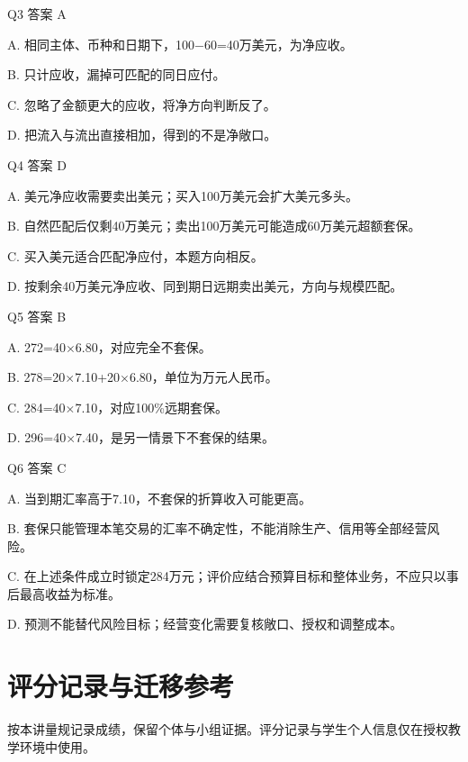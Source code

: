 \documentclass[lang=cn,11pt,oneside,openany,chinesefont=nofont,color=blue,titlestyle=hang]{elegantbook}
\begin{document}
Q3  答案 A

A. 相同主体、币种和日期下，100\ensuremath{-}60=40万美元，为净应收。

B. 只计应收，漏掉可匹配的同日应付。

C. 忽略了金额更大的应收，将净方向判断反了。

D. 把流入与流出直接相加，得到的不是净敞口。

Q4  答案 D

A. 美元净应收需要卖出美元；买入100万美元会扩大美元多头。

B. 自然匹配后仅剩40万美元；卖出100万美元可能造成60万美元超额套保。

C. 买入美元适合匹配净应付，本题方向相反。

D. 按剩余40万美元净应收、同到期日远期卖出美元，方向与规模匹配。

Q5  答案 B

A. 272=40\ensuremath{\times}6.80，对应完全不套保。

B. 278=20\ensuremath{\times}7.10+20\ensuremath{\times}6.80，单位为万元人民币。

C. 284=40\ensuremath{\times}7.10，对应100\%远期套保。

D. 296=40\ensuremath{\times}7.40，是另一情景下不套保的结果。

Q6  答案 C

A. 当到期汇率高于7.10，不套保的折算收入可能更高。

B. 套保只能管理本笔交易的汇率不确定性，不能消除生产、信用等全部经营风险。

C. 在上述条件成立时锁定284万元；评价应结合预算目标和整体业务，不应只以事后最高收益为标准。

D. 预测不能替代风险目标；经营变化需要复核敞口、授权和调整成本。
\endgroup

\clearpage

\section{评分记录与迁移参考}\label{sec:g19}

按本讲量规记录成绩，保留个体与小组证据。评分记录与学生个人信息仅在授权教学环境中使用。
\end{document}
